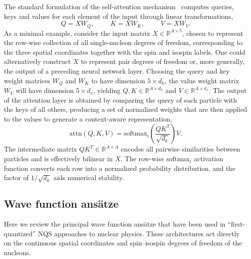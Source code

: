 The standard formulation of the self-attention mechanism~\cite{vaswani_attention_2017}
computes queries, keys and values for each element of the input through linear
transformations,
\begin{equation}
    Q = X W_Q, \hspace{1cm} 
    K = X W_K, \hspace{1cm} 
    V = X W_V .
\label{eq:attn-weights}
\end{equation}
As a minimal example, consider the input matrix $X \in \mathbb{R}^{A \times 5}$, chosen to represent the row-wise collection of all single-nucleon degrees of freedom, corresponding to the three spatial coordinates together with the spin and isospin labels. One could alternatively construct $X$ to represent pair degrees of freedom or, more generally, the output of a preceding neural network layer.
Choosing the query and key weight matrices $W_Q$ and $W_K$ to have dimension
$5 \times d_k$, the value weight matrix $W_V$ will have dimension
$5 \times d_v$, yielding $Q, K \in \mathbb{R}^{A \times d_k}$ and
$V \in \mathbb{R}^{A \times d_v}$.
The output of the attention layer is obtained by comparing the query of each particle with the keys of all others, producing a set of normalized weights that are then applied to the values to generate a context-aware representation,
\begin{equation}
    \mathrm{attn}(Q, K, V)
    = \mathrm{softmax}_i \!\left( \frac{Q K^T}{\sqrt{d_k}} \right) V .
\end{equation}
The intermediate matrix $QK^T \in \mathbb{R}^{A \times A}$ encodes all pairwise
similarities between particles and is effectively bilinear in $X$. The row-wise
$\mathrm{softmax}_i$ activation function converts each row into a normalized probability
distribution, and the factor of $1/\sqrt{d_k}$ aids numerical stability.



\subsection{Wave function ansätze}
\label{sec:wavefunction}
Here we review the principal wave function ansätze that have been used in ``first-quantized'' NQS approaches to nuclear physics. These architectures act directly on the continuous spatial coordinates and spin–isospin degrees of freedom of the nucleons.

